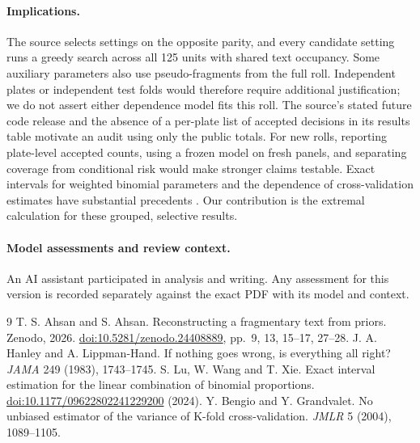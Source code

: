 \documentclass[11pt]{article}
\begin{document}
\paragraph{Implications.} The source selects settings on the opposite parity, and every candidate setting runs a greedy search across all 125 units with shared text occupancy. Some auxiliary parameters also use pseudo-fragments from the full roll. Independent plates or independent test folds would therefore require additional justification; we do not assert either dependence model fits this roll. The source's stated future code release and the absence of a per-plate list of accepted decisions in its results table motivate an audit using only the public totals. For new rolls, reporting plate-level accepted counts, using a frozen model on fresh panels, and separating coverage from conditional risk would make stronger claims testable. Exact intervals for weighted binomial parameters and the dependence of cross-validation estimates have substantial precedents \cite{lu,bengio}. Our contribution is the extremal calculation for these grouped, selective results.
\paragraph{Model assessments and review context.} An AI assistant participated in analysis and writing. Any assessment for this version is recorded separately against the exact PDF with its model and context.
\newpage
\begin{thebibliography}{9}\small
{} T. S. Ahsan and S. Ahsan. Reconstructing a fragmentary text from priors. Zenodo, 2026. \href{https://doi.org/10.5281/zenodo.24408889}{doi:10.5281/zenodo.24408889}, pp.~9, 13, 15--17, 27--28.
 J. A. Hanley and A. Lippman-Hand. If nothing goes wrong, is everything all right? \emph{JAMA} 249 (1983), 1743--1745.
 S. Lu, W. Wang and T. Xie. Exact interval estimation for the linear combination of binomial proportions. \href{https://doi.org/10.1177/09622802241229200}{doi:10.1177/09622802241229200} (2024).
 Y. Bengio and Y. Grandvalet. No unbiased estimator of the variance of K-fold cross-validation. \emph{JMLR} 5 (2004), 1089--1105.
\end{thebibliography}
\end{document}
